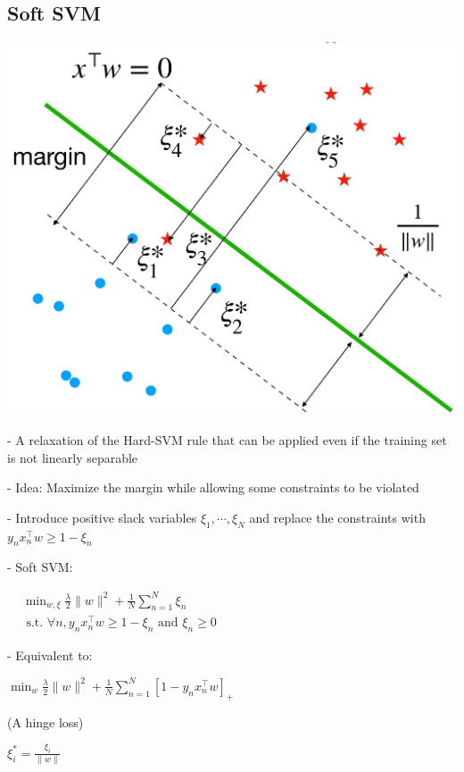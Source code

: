 
\subsection*{Soft SVM}

  \includegraphics[width=0.7\columnwidth]{figures/soft_svm.jpg}

- A relaxation of the Hard-SVM rule that can be applied even if the training set is not linearly separable

- Idea: Maximize the margin while allowing some constraints to be violated

- Introduce positive slack variables $\xi_{1}, \cdots, \xi_{N}$ and replace the constraints with $y_{n} x_{n}^{\top} w \geq 1-\xi_{n}$ 

- Soft SVM:

$
\begin{aligned}
& \min _{w, \xi} \frac{\lambda}{2}\|w\|^{2}+\frac{1}{N} \sum_{n=1}^{N} \xi_{n} \\
& \text { s.t. } \forall n, y_{n} x_{n}^{\top} w \geq 1-\xi_{n} \text { and } \xi_{n} \geq 0
\end{aligned}
$

- Equivalent to:

$
\min _{w} \frac{\lambda}{2}\|w\|^{2}+\frac{1}{N} \sum_{n=1}^{N}\left[1-y_{n} x_{n}^{\top} w\right]_{+}
$

(A hinge loss)


$
\xi_{i}^{*}=\frac{\xi_{i}}{\|w\|}
$


